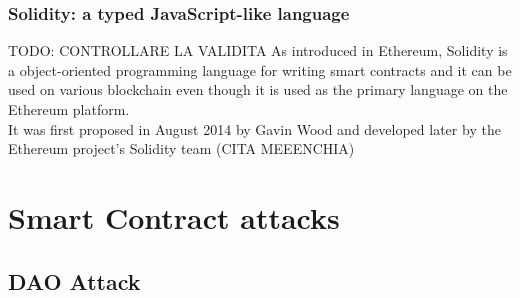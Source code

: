 \subsubsection{Solidity: a typed JavaScript-like language}
TODO: CONTROLLARE LA VALIDITA 
As introduced in Ethereum, Solidity is a object-oriented programming language for writing smart contracts and it can be used on various blockchain even though it is used as the primary language on the Ethereum platform.
\\It was first proposed in August 2014 by Gavin Wood and developed later by the Ethereum project's Solidity team (CITA MEEENCHIA)

\section{Smart Contract attacks}

\subsection{DAO Attack}
